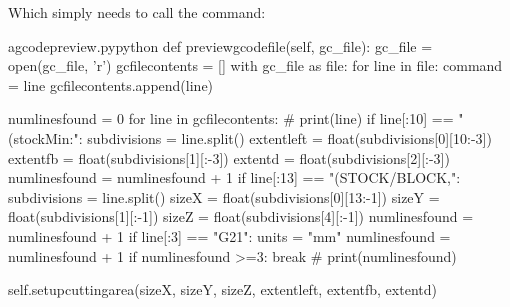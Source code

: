 \documentclass{ltxdoc}
\begin{document}
\noindent Which simply needs to call the  command:

\lstset{firstnumber=\thegcpy}
\begin{writecode}{a}{gcodepreview.py}{python}
    def previewgcodefile(self, gc_file):
        gc_file = open(gc_file, 'r')
        gcfilecontents = []
        with gc_file as file:
            for line in file:
                command = line
                gcfilecontents.append(line)

        numlinesfound = 0
        for line in gcfilecontents:
#            print(line)
            if line[:10] == "(stockMin:":
                subdivisions = line.split()
                extentleft = float(subdivisions[0][10:-3])
                extentfb = float(subdivisions[1][:-3])
                extentd = float(subdivisions[2][:-3])
                numlinesfound = numlinesfound + 1
            if line[:13] == "(STOCK/BLOCK,":
                subdivisions = line.split()
                sizeX = float(subdivisions[0][13:-1])
                sizeY = float(subdivisions[1][:-1])
                sizeZ = float(subdivisions[4][:-1])
                numlinesfound = numlinesfound + 1
            if line[:3] == "G21":
                units = "mm"
                numlinesfound = numlinesfound + 1
            if numlinesfound >=3:
                break
#            print(numlinesfound)

        self.setupcuttingarea(sizeX, sizeY, sizeZ, extentleft, extentfb, extentd)


\end{writecode}
\end{document}
